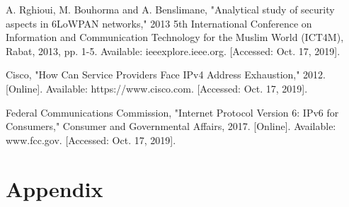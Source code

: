 \documentclass[11pt]{article}
\begin{document}
\newpage

\begin{thebibliography}{99}

 A. Rghioui, M. Bouhorma and A. Benslimane, "Analytical study of security aspects in 6LoWPAN networks," 2013 5th International Conference on Information and Communication Technology for the Muslim World (ICT4M), Rabat, 2013, pp. 1-5. Available: ieeexplore.ieee.org. [Accessed: Oct. 17, 2019].

 Cisco, "How Can Service Providers Face IPv4 Address Exhaustion," 2012. [Online]. Available: https://www.cisco.com. [Accessed: Oct. 17, 2019].

 Federal Communications Commission, "Internet Protocol Version 6: IPv6 for Consumers,"  Consumer and Governmental Affairs, 2017. [Online]. Available: www.fcc.gov. [Accessed: Oct. 17, 2019].


\end{thebibliography}

\newpage

\section*{Appendix}
\end{document}
